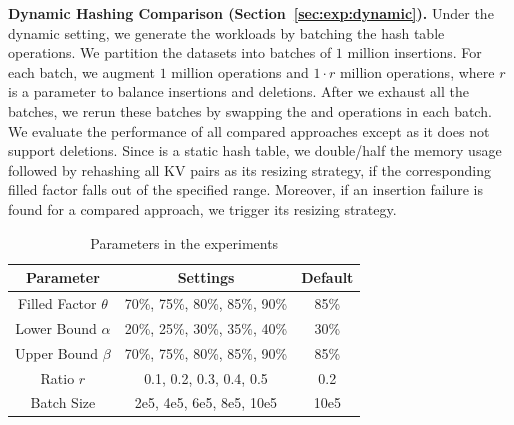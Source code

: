 

\vspace{1mm}\noindent\textbf{Dynamic Hashing Comparison (Section~\ref{sec:exp:dynamic}).}
Under the dynamic setting, we generate the workloads by batching the hash table operations. 
We partition the datasets into batches of $1$ million insertions. 
For each batch, we augment $1$ million  operations and $1 \cdot r$ million  operations,
where $r$ is a parameter to balance insertions and deletions.
After we exhaust all the batches, we rerun these batches by swapping the  and  operations in each batch. 
We evaluate the performance of all compared approaches except \cudpp as it does not support deletions. 
Since \megakv is a static hash table, we double/half the memory usage followed by rehashing all KV pairs as its resizing strategy, if the corresponding filled factor falls out of the specified range. 
Moreover, if an insertion failure is found for a compared approach, we trigger its resizing strategy.

\begin{table}[t]
	\centering
	\caption{Parameters in the experiments}
	\vspace{-1.5em}
	\label{tbl:parameters}
	\begin{tabular}{|c|c|c|}
		\hline
		\textbf{Parameter} & \textbf{Settings} & \textbf{Default} \\ \hline
		Filled Factor	$\theta$  & 70\%, 75\%, 80\%, 85\%, 90\% & 85\% \\ \hline
		Lower Bound $\alpha$ & 20\%, 25\%, 30\%, 35\%, 40\% & 30\% \\ \hline
		Upper Bound	$\beta$  & 70\%, 75\%, 80\%, 85\%, 90\% & 85\% \\ \hline
		Ratio $r$ & 0.1, 0.2, 0.3, 0.4, 0.5 & 0.2 \\ \hline
		Batch Size & 2e5, 4e5, 6e5, 8e5, 10e5 & 10e5 \\ \hline
	\end{tabular}
\end{table}

